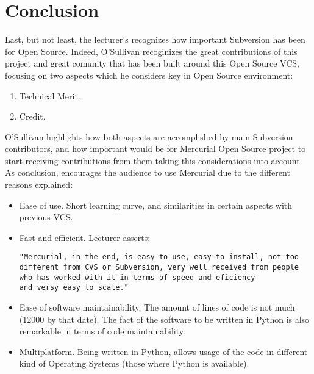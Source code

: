 \documentclass[11pt]{article}
\begin{document}
\section{Conclusion}
Last, but not least, the lecturer's recognizes how important Subversion has been for Open Source. Indeed, O'Sullivan recoginizes the great contributions of this project and great comunity that has been built around this Open Source VCS, focusing on two aspects which he considers key in Open Source environment:
\begin{enumerate}
\item{Technical Merit}.
\item{Credit}.
\end{enumerate}
O'Sullivan highlights how both aspects are accomplished by main Subversion contributors, and how important would be for Mercurial Open Source project to start receiving contributions from them taking this considerations into account.
As conclusion, encourages the audience to use Mercurial due to the different reasons explained:
\begin{itemize}\itemsep0pt
\item{Ease of use}. Short learning curve, and similarities in certain aspects with previous VCS.
\item{Fast and efficient}. Lecturer asserts:
\begin{verbatim}
"Mercurial, in the end, is easy to use, easy to install, not too
different from CVS or Subversion, very well received from people
who has worked with it in terms of speed and eficiency
and versy easy to scale."
\end{verbatim}
\item{Ease of software maintainability}. The amount of lines of code is not much (12000 by that date). The fact of the software to be written in Python is also remarkable in terms of code maintainability.
\item{Multiplatform}. Being written in Python, allows usage of the code in different kind of Operating Systems (those where Python is available).
\end{itemize}

{}
\end{document}
